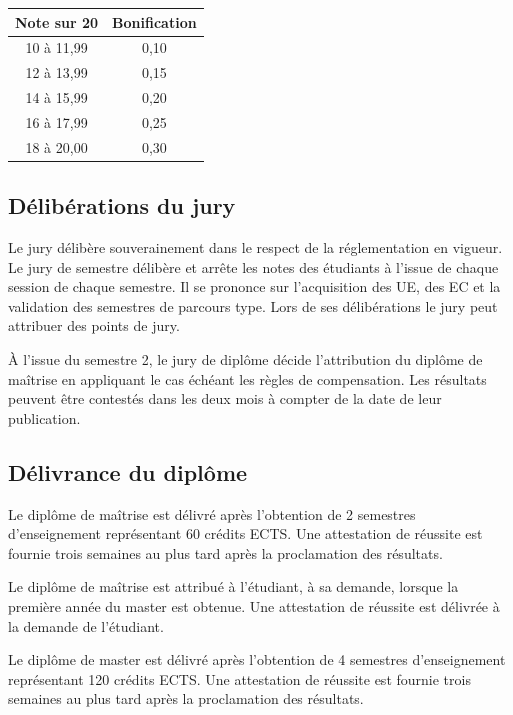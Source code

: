 \documentclass[a4paper,11pt]{article}
\begin{document}
\begin{table}[htpb] 
\begin{center}
    \begin{tabular}{c c}
        \toprule
        Note sur 20 & Bonification\\ 
        \midrule
        10 à 11,99 & 0,10 \\ 
        12 à 13,99 & 0,15 \\ 
        14 à 15,99 & 0,20 \\ 
        16 à 17,99 & 0,25 \\ 
        18 à 20,00 & 0,30 \\ 
        \bottomrule
    \end{tabular} 
\end{center}
\end{table}


\subsection{Délibérations du jury}
Le jury délibère souverainement dans le respect de la réglementation en vigueur.
Le jury de semestre délibère et arrête les notes des étudiants à l'issue de chaque session de chaque semestre. Il se prononce sur l'acquisition des UE, des EC et la validation des semestres de parcours type.
Lors de ses délibérations le jury peut attribuer des points de jury.

À l'issue du semestre 2, le jury de diplôme décide l'attribution du diplôme de maîtrise en appliquant le cas échéant les règles de compensation.
Les résultats peuvent être contestés dans les deux mois à compter de la date de leur publication.


\subsection{Délivrance du diplôme}
Le diplôme de maîtrise est délivré après l'obtention de 2 semestres d'enseignement représentant 60 crédits ECTS. Une attestation de réussite est fournie trois semaines au plus tard après la proclamation des résultats.

Le diplôme de maîtrise est attribué à l'étudiant, à sa demande, lorsque la première année du master est obtenue. Une attestation de réussite est délivrée à la demande de l'étudiant.

Le diplôme de master est délivré après l'obtention de 4 semestres d'enseignement représentant 120 crédits ECTS. Une attestation de réussite est fournie trois semaines au plus tard après la proclamation des résultats.
\end{document}

